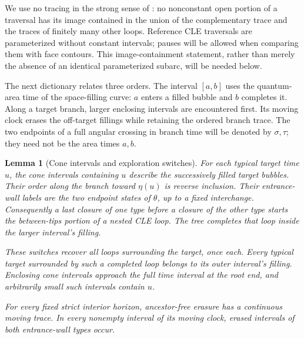 \documentclass[11pt]{article}
\numberwithin{equation}{section}
\newtheorem{lemma}[theorem]{Lemma}
\theoremstyle{definition}
\theoremstyle{remark}
\newcommand{\1}{\mathbf 1}
\begin{document}
We use no tracing in the strong sense of
\cite[Definitions~2.4--2.5]{GwynneMillerQianCLE}: no nonconstant
open portion of a traversal has its image contained in the union of
the complementary trace and the traces of finitely many other loops.  Reference
CLE traversals are parameterized without constant intervals; pauses
will be allowed when comparing them with face contours.  This
image-containment statement, rather than merely the absence of an
identical parameterized subarc, will be needed below.

The next dictionary relates three orders.  The interval $[a,b]$ uses
the quantum-area time of the space-filling curve: $a$ enters a filled
bubble and $b$ completes it.  Along a target branch, larger enclosing
intervals are encountered first.  Its moving clock erases the off-target
fillings while retaining the ordered branch trace.  The two endpoints
of a full angular crossing in branch time will be denoted by
$\sigma,\tau$; they need not be the area times $a,b$.

\begin{lemma}[Cone intervals and exploration switches]
\label{loop:switches}
For each typical target time $u$, the cone intervals containing $u$
describe the successively filled target bubbles.  Their order along the
branch toward $\eta(u)$ is reverse inclusion.  Their entrance-wall labels
are the two endpoint states of $\theta$, up to a fixed interchange.
Consequently a last closure of one type before a closure of the other
type starts the between-tips portion of a nested CLE loop.  The tree
completes that loop inside the larger interval's filling.

These switches recover all loops surrounding the target, once each.
Every typical target surrounded by such a completed loop belongs to its
outer interval's filling.  Enclosing cone intervals approach the full
time interval at the root end, and arbitrarily small such intervals
contain $u$.

For every fixed strict interior horizon, ancestor-free erasure has a
continuous moving trace.  In every nonempty interval of its moving
clock, erased intervals of both entrance-wall types occur.
\end{lemma}
\end{document}
